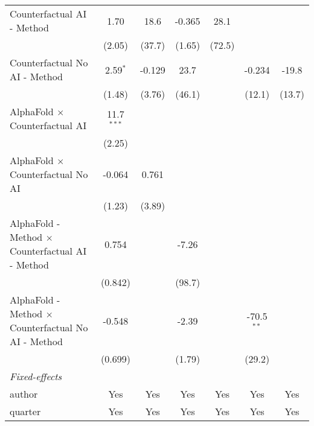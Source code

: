 \begin{tabular}{lcccccc}
   Counterfactual AI - Method                                 & 1.70         & 18.6    & -0.365       & 28.1          &              &   \\   
                                                              & (2.05)       & (37.7)  & (1.65)       & (72.5)        &              &   \\   
   Counterfactual No AI - Method                              & 2.59$^{*}$   & -0.129  & 23.7         &               & -0.234       & -19.8\\   
                                                              & (1.48)       & (3.76)  & (46.1)       &               & (12.1)       & (13.7)\\   
   AlphaFold $\times$ Counterfactual AI                       & 11.7$^{***}$ &         &              &               &              &   \\   
                                                              & (2.25)       &         &              &               &              &   \\   
   AlphaFold $\times$ Counterfactual No AI                    & -0.064       & 0.761   &              &               &              &   \\   
                                                              & (1.23)       & (3.89)  &              &               &              &   \\   
   AlphaFold - Method $\times$ Counterfactual AI - Method     & 0.754        &         & -7.26        &               &              &   \\   
                                                              & (0.842)      &         & (98.7)       &               &              &   \\   
   AlphaFold - Method $\times$ Counterfactual No AI - Method  & -0.548       &         & -2.39        &               & -70.5$^{**}$ &   \\   
                                                              & (0.699)      &         & (1.79)       &               & (29.2)       &   \\   
   \midrule
   \emph{Fixed-effects}\\
   author                                                     & Yes          & Yes     & Yes          & Yes           & Yes          & Yes\\  
   quarter                                                    & Yes          & Yes     & Yes          & Yes           & Yes          & Yes\\  

\end{tabular}
